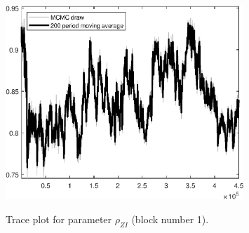 \begin{figure}[H]
\centering
  \includegraphics[width=0.8\textwidth]{BRS_sectoral_wo_vcu/graphs/TracePlot_rho_ZI_blck_1}\\
    \caption{Trace plot for parameter ${\rho_{ZI}}$ (block number 1).}
\end{figure}
